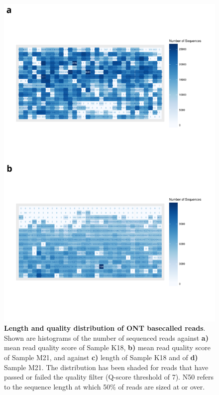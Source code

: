 \begin{figure}[htp]
	\begin{center}
		\includegraphics[page=3,trim={0 0cm 0cm 10cm},clip, scale = 0.45]{Figures/ONTWholeTranscriptome.pdf}
	\end{center}
	\captionsetup{width=0.95\textwidth}
	\caption[ONT read length and quality from Whole Transcriptome Sequencing ]%
	{\textbf{Length and quality distribution of ONT basecalled reads}. Shown are histograms of the number of sequenced reads against \textbf{a)} mean read quality score of Sample K18, \textbf{b)} mean read quality score of Sample M21, and against \textbf{c)} length of Sample K18 and of \textbf{d)} Sample M21. The distribution has been shaded for reads that have passed or failed the quality filter (Q-score threshold of 7). N50 refers to the sequence length at which 50\% of reads are sized at or over. }
	\label{fig:ont_lengthquality}
\end{figure}

